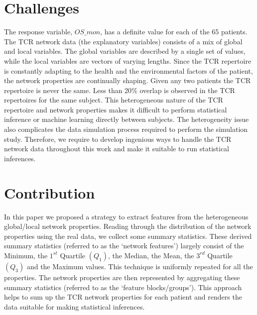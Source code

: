 \section{Challenges}\label{sec:challenges}
The response variable, $OS\_mon$, has a definite value for each of the 65 patients. The TCR network data (the explanatory variables) consists of a mix of global and local variables. The global variables are described by a single set of values, while the local variables are vectors of varying lengths. Since the TCR repertoire is constantly adapting to the health and the environmental factors of the patient, the network properties are continually shaping. Given any two patients the TCR repertoire is never the same. Less than 20$\%$ overlap is observed in the TCR repertoires for the same subject. This heterogeneous nature of the TCR repertoire and network properties makes it difficult to perform statistical inference or machine learning directly between subjects. The heterogeneity issue also complicates the data simulation process required to perform the simulation study. Therefore, we require to develop ingenious ways to handle the TCR network data throughout this work and make it suitable to run statistical inferences.\par

\section{Contribution}\label{sec:contribution}
In this paper we proposed a strategy to extract features from the heterogeneous global/local network properties. Reading through the distribution of the network properties using the real data, we collect some summary statistics. These derived summary statistics (referred to as the \lq network features') largely consist of the Minimum, the $1^{st}$ Quartile $(Q_1)$, the Median, the Mean, the $3^{rd}$ Quartile $(Q_3)$ and the Maximum values. This technique is uniformly repeated for all the properties. The network properties are then represented by aggregating these summary statistics (referred to as the \lq feature blocks/groups'). This approach helps to sum up the TCR network properties for each patient and renders the data suitable for making statistical inferences.\par

